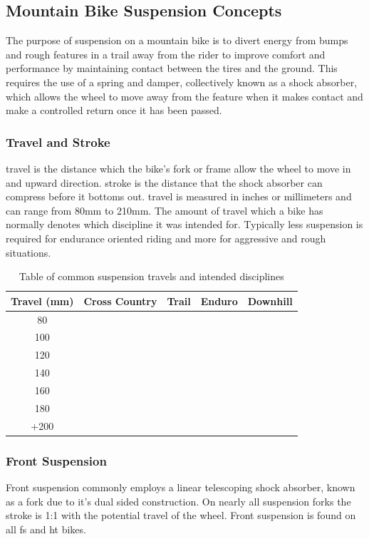 	\subsection{Mountain Bike Suspension Concepts}
		The purpose of suspension on a mountain bike is to divert energy from bumps and rough features in a trail away from the rider to improve comfort and  performance by maintaining contact between the tires and the ground. This requires the use of a spring and damper, collectively known as a shock absorber, which allows the wheel to move away from the feature when it makes contact and make a controlled return once it has been passed.
	\subsubsection{Travel and Stroke} 
		\Gls{travel} is the distance which the bike's fork or frame allow the wheel to move in and upward direction. \Gls{stroke} is the distance that the shock absorber can compress before it bottoms out. \Gls{travel} is measured in inches or millimeters and can range from 80mm to 210mm. The amount of \gls{travel} which a bike has normally denotes which discipline it was intended for. Typically less suspension is required for endurance oriented riding and more for aggressive and rough situations.
		\begin{table}[h!]
		\centering
		\caption{Table of common suspension \glspl{travel} and intended disciplines}
		\label{tab:table1}
		\begin{tabular}{|c|cccc|}
			\hline
			Travel (mm)&Cross Country&Trail&Enduro&Downhill\\
			\hline
			80&\cellcolor[gray]{0.5}&&&
			\\
			100&\cellcolor[gray]{0.5}&&&
			\\
			120&\cellcolor[gray]{0.5}&\cellcolor[gray]{0.5}&&
			\\
			140&&\cellcolor[gray]{0.5}&\cellcolor[gray]{0.5}&
			\\
			160&&&\cellcolor[gray]{0.5}&
			\\
			180&&&\cellcolor[gray]{0.5}&\cellcolor[gray]{0.5}
			\\
			+200&&&&\cellcolor[gray]{0.5}\\
			\hline
		\end{tabular}
	\end{table}
	\subsubsection{Front Suspension}
		Front suspension commonly employs a linear telescoping shock absorber, known as a \gls{fork} due to it's dual sided construction. On nearly all suspension \glspl{fork} the \gls{stroke} is 1:1 with the potential travel of the wheel. Front suspension is found on all \gls{fs} and \gls{ht} bikes.
